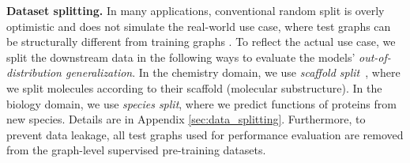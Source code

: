 \documentclass{article} \usepackage{iclr2020_conference,times}
\numberwithin{equation}{section}
\theoremstyle{plain}
\theoremstyle{definition}
\theoremstyle{remark}
\begin{document}
{\bf Dataset splitting.} In many applications, conventional random split is overly optimistic and does not simulate the real-world use case, where test graphs can be structurally different from training graphs \citep{wu2018moleculenet,Zitnik2019}. To reflect the actual use case, we split the downstream data in the following ways to evaluate the models' {\em out-of-distribution generalization}.
In the chemistry domain, we use \emph{scaffold split}~\citep{Ramsundar-et-al-2019}, where we split molecules according to their scaffold (molecular substructure). In the biology domain, we use \emph{species split}, where we predict functions of proteins from new species.
Details are in Appendix \ref{sec:data_splitting}.
Furthermore, to prevent data leakage, all test graphs used for performance evaluation are removed from the graph-level supervised pre-training datasets.
\end{document}
